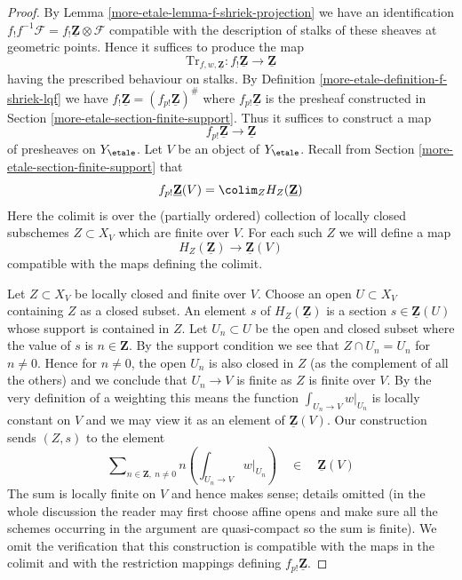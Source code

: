 \begin{proof}
By Lemma \ref{more-etale-lemma-f-shriek-projection} we have an identification
$f_!f^{-1}\mathcal{F} = f_!\underline{\mathbf{Z}} \otimes \mathcal{F}$
compatible with the description of stalks of these sheaves at
geometric points. Hence it suffices to produce the map
$$
\text{Tr}_{f, w, \underline{\mathbf{Z}}} :
f_!\underline{\mathbf{Z}}
\longrightarrow
\underline{\mathbf{Z}}
$$
having the prescribed behaviour on stalks. By
Definition \ref{more-etale-definition-f-shriek-lqf} we have
$f_!\underline{\mathbf{Z}} = (f_{p!}\underline{\mathbf{Z}})^\#$
where $f_{p!}\underline{\mathbf{Z}}$ is the presheaf
constructed in Section \ref{more-etale-section-finite-support}.
Thus it suffices to construct a map
$$
f_{p!}\underline{\mathbf{Z}} \longrightarrow \underline{\mathbf{Z}}
$$
of presheaves on $Y_\etale$. Let $V$ be an object of $Y_\etale$.
Recall from Section \ref{more-etale-section-finite-support} that
$$
f_{p!}\underline{\mathbf{Z}}(V) = \colim_Z H_Z(\underline{\mathbf{Z}})
$$
Here the colimit is over the (partially ordered) collection of locally closed
subschemes $Z \subset X_V$ which are finite over $V$. For each such
$Z$ we will define a map
$$
H_Z(\underline{\mathbf{Z}}) \longrightarrow \underline{\mathbf{Z}}(V)
$$
compatible with the maps defining the colimit.

\medskip\noindent
Let $Z \subset X_V$ be locally closed and finite over $V$.
Choose an open $U \subset X_V$ containing $Z$ as a closed subset.
An element $s$ of $H_Z(\underline{\mathbf{Z}})$ is a section
$s \in \underline{\mathbf{Z}}(U)$ whose support is contained in $Z$.
Let $U_n \subset U$ be the open and closed subset where the value
of $s$ is $n \in \mathbf{Z}$. By the support condition we see that
$Z \cap U_n = U_n$ for $n \not = 0$. Hence for $n \not = 0$, the open
$U_n$ is also closed in $Z$ (as the complement of all the others)
and we conclude that $U_n \to V$ is finite as $Z$ is finite over $V$.
By the very definition of a weighting this means the
function $\int_{U_n \to V} w|_{U_n}$ is locally constant on $V$
and we may view it as an element of $\underline{\mathbf{Z}}(V)$.
Our construction sends $(Z, s)$ to the element
$$
\sum\nolimits_{n \in \mathbf{Z},\ n \not = 0}
n \left(\int_{U_n \to V} w|_{U_n}\right)
\quad \in \quad \underline{\mathbf{Z}}(V)
$$
The sum is locally finite on $V$ and hence makes sense; details omitted
(in the whole discussion the reader may first choose affine opens and
make sure all the schemes occurring in the argument are quasi-compact so
the sum is finite). We omit the verification that this construction
is compatible with the maps in the colimit and with the restriction
mappings defining $f_{p!}\underline{\mathbf{Z}}$.


\end{proof}
